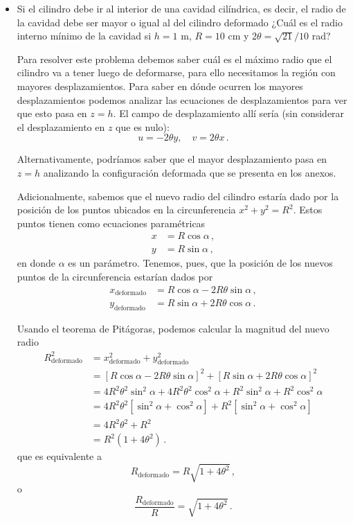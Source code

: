\documentclass[../notas medios.tex]{subfiles}
\begin{document}
\begin{itemize}
\item
Si el cilindro debe ir al interior de una cavidad cilíndrica, es decir, el radio de la cavidad debe ser mayor o igual al del cilindro deformado ¿Cuál es el radio interno mínimo de la cavidad si $h=1$ m, $R = 10$ cm y $2\theta = \sqrt{21}/10$ rad?


Para resolver este problema debemos saber cuál es el máximo radio que el cilindro va a tener luego de deformarse, para ello necesitamos la región con mayores desplazamientos. Para saber en dónde ocurren los mayores desplazamientos podemos analizar las ecuaciones de desplazamientos para ver que esto pasa en $z=h$. El campo de desplazamiento allí sería (sin considerar el desplazamiento en $z$ que es nulo):
\[u = -2\theta y,\quad v = 2\theta x\, .\]

Alternativamente, podríamos saber que el mayor desplazamiento pasa en $z=h$ analizando la configuración deformada que se presenta en los anexos.

Adicionalmente, sabemos que el nuevo radio del cilindro estaría dado por la posición de los puntos ubicados en la circunferencia $x^2 + y^2 = R^2$. Estos puntos tienen como ecuaciones paramétricas
\begin{align*}
  x &= R \cos\alpha\, ,\\
  y &= R \sin\alpha\, ,
\end{align*}
en donde $\alpha$ es un parámetro. Tenemos, pues, que la posición de los nuevos puntos de la circunferencia estarían dados por
\begin{align*}
  x_\text{deformado} &= R \cos\alpha - 2R\theta \sin\alpha \, ,\\
  y_\text{deformado} &= R \sin\alpha + 2R\theta \cos\alpha\, .
\end{align*}

Usando el teorema de Pitágoras, podemos calcular la magnitud del nuevo radio
\begin{align*}
  R_\text{deformado}^2 &= x_\text{deformado}^2 + y_\text{deformado}^2\\
    &= [R \cos\alpha - 2R\theta \sin\alpha]^2 + [R \sin\alpha + 2R\theta \cos\alpha]^2\\
    &= 4R^2\theta^2\sin^2\alpha + 4R^2\theta^2\cos^2\alpha + R^2\sin^2\alpha + R^2\cos^2\alpha\\
    &= 4R^2\theta^2[\sin^2\alpha + \cos^2\alpha] + R^2[\sin^2\alpha + \cos^2\alpha]\\
    &= 4R^2\theta^2 + R^2\\
    &= R^2 (1 + 4\theta^2)\, .
\end{align*}
que es equivalente a
\[R_\text{deformado} = R\sqrt{1 + 4\theta^2}\, ,\]
o
\[\frac{R_\text{deformado}}{R} = \sqrt{1 + 4\theta^2}\, .\]


\end{itemize}
\end{document}
